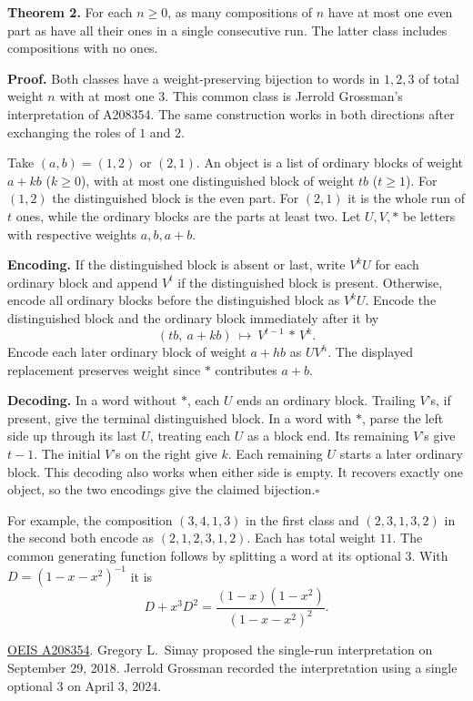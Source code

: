 \documentclass[12pt,letterpaper]{article}
\newcommand{\lead}[1]{\textbf{\color{ink}#1.}\enspace}
\newcommand{\qedx}{\hfill\(\square\)}
\newcommand{\source}[1]{\vfill{\small\color{muted}#1\par}}
\newcommand{\oeis}[1]{\href{https://oeis.org/#1}{OEIS #1}}
\begin{document}
\lead{Theorem 2} For each $n\ge0$, as many compositions of $n$ have at most one
even part as have all their ones in a single consecutive run. The latter
class includes compositions with no ones.

\lead{Proof} Both classes have a weight-preserving bijection to words in
$1,2,3$ of total weight $n$ with at most one $3$. This common class is
Jerrold Grossman's interpretation of A208354. The same construction works in
both directions after exchanging the roles of $1$ and $2$.

Take $(a,b)=(1,2)$ or $(2,1)$. An object is a list of ordinary blocks of weight
$a+kb$ ($k\ge0$), with at most one distinguished block of weight $tb$ ($t\ge1$).
For $(1,2)$ the distinguished block is the even part. For $(2,1)$ it is
the whole run of $t$ ones, while the ordinary blocks are the parts at least two.
Let $U,V,*$ be letters with respective weights $a,b,a+b$.

\lead{Encoding} If the distinguished block is absent or last, write $V^kU$
for each ordinary block and append $V^t$ if the distinguished block is present.
Otherwise, encode all ordinary blocks before the distinguished block as $V^kU$.
Encode the distinguished block and the ordinary block immediately after it by
\[
             (tb,\ a+kb)\ \longmapsto\ V^{t-1}\,*\,V^k .
\]
Encode each later ordinary block of weight $a+hb$ as $UV^h$. The displayed
replacement preserves weight since $*$ contributes $a+b$.

\lead{Decoding} In a word without $*$, each $U$ ends an ordinary block.
Trailing $V$'s, if present, give the terminal distinguished block. In a word
with $*$, parse the left side up through its last $U$, treating each $U$ as a
block end. Its remaining $V$'s give $t-1$. The initial $V$'s on the right
give $k$. Each remaining $U$ starts a later ordinary block. This decoding
also works when either side is empty. It recovers exactly one object, so the two
encodings give the claimed bijection.\qedx

For example, the composition $(3,4,1,3)$ in the first class and $(2,3,1,3,2)$
in the second both encode as $(2,1,2,3,1,2)$. Each has total weight $11$.
The common generating function follows by splitting a word at its optional $3$.
With $D=(1-x-x^2)^{-1}$ it is
\[
 D+x^3D^2=\frac{(1-x)(1-x^2)}{(1-x-x^2)^2}.
\]
\source{\oeis{A208354}. Gregory L.~Simay proposed the single-run interpretation
on September 29, 2018. Jerrold Grossman recorded the interpretation using a
single optional $3$ on April 3, 2024.}
\end{document}
